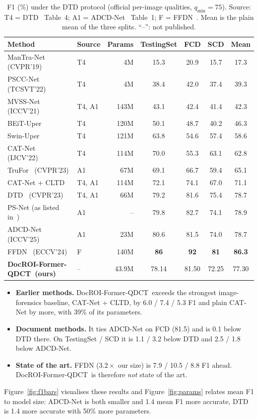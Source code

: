 \documentclass[11pt,a4paper]{article}
\newcommand{\ours}{DocROI-Former-QDCT}
\newcommand{\best}[1]{\textbf{#1}}
\begin{document}
\begin{table}[!htbp]
\centering
\caption{F1 (\%) under the DTD protocol (official per-image qualities, $q_{\min}=75$). Source:
T4 = DTD~\cite{dtd} Table~4; A1 = ADCD-Net~\cite{adcd} Table~1; F = FFDN~\cite{ffdn}. Mean is the
plain mean of the three splits. ``--'': not published.}
\label{tab:f1}
\begin{tabular}{@{}llrcccc@{}}
\toprule
Method & Source & Params & TestingSet & FCD & SCD & Mean \\
\midrule
ManTra-Net~\cite{mantra} (CVPR'19) & T4 & 4M & 15.3 & 20.9 & 15.7 & 17.3 \\
PSCC-Net~\cite{pscc} (TCSVT'22)    & T4 & 4M & 38.4 & 42.0 & 37.4 & 39.3 \\
MVSS-Net~\cite{mvss} (ICCV'21)     & T4, A1 & 143M & 43.1 & 42.4 & 41.4 & 42.3 \\
BEiT-Uper~\cite{beit,upernet}      & T4 & 120M & 50.1 & 48.7 & 40.2 & 46.3 \\
Swin-Uper~\cite{swin,upernet}      & T4 & 121M & 63.8 & 54.6 & 57.4 & 58.6 \\
CAT-Net~\cite{catnet} (IJCV'22)    & T4 & 114M & 70.0 & 55.3 & 63.1 & 62.8 \\
TruFor~\cite{trufor} (CVPR'23)     & A1 & 67M  & 69.1 & 66.7 & 59.4 & 65.1 \\
CAT-Net + CLTD~\cite{catnet,dtd}   & T4, A1 & 114M & 72.1 & 74.1 & 67.0 & 71.1 \\
DTD~\cite{dtd} (CVPR'23)           & T4, A1 & 66M & 79.2 & 81.6 & 75.4 & 78.7 \\
PS-Net (as listed in~\cite{adcd})  & A1 & -- & 79.8 & 82.7 & 74.1 & 78.9 \\
ADCD-Net~\cite{adcd} (ICCV'25)     & A1 & 23M & 80.6 & 81.5 & 74.0 & 78.7 \\
FFDN~\cite{ffdn} (ECCV'24)         & F  & 140M & \best{86} & \best{92} & \best{81} & \best{86.3} \\
\midrule
\textbf{\ours\ (ours)} & -- & 43.9M & 78.14 & 81.50 & 72.25 & 77.30 \\
\bottomrule
\end{tabular}
\end{table}

\begin{itemize}
  \item \textbf{Earlier methods.} \ours\ exceeds the strongest image-forensics baseline,
        CAT-Net + CLTD, by 6.0 / 7.4 / 5.3 F1 and plain CAT-Net by more, with 39\% of its
        parameters.
  \item \textbf{Document methods.} It ties ADCD-Net on FCD (81.5) and is 0.1 below DTD there. On
        TestingSet / SCD it is 1.1 / 3.2 below DTD and 2.5 / 1.8 below ADCD-Net.
  \item \textbf{State of the art.} FFDN ($3.2\times$ our size) is 7.9 / 10.5 / 8.8 F1 ahead.
        \ours\ is therefore \emph{not} state of the art.
\end{itemize}
Figure~\ref{fig:f1bars} visualises these results and Figure~\ref{fig:params} relates mean F1 to
model size: ADCD-Net is both smaller and 1.4 mean F1 more accurate, DTD is 1.4 more accurate with
50\% more parameters.
\end{document}
